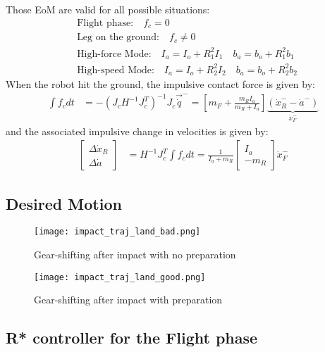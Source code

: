 %
Those EoM are valid for all possible situations:
%
\begin{align}
&\text{Flight phase:} \quad f_c = 0 \\
&\text{Leg on the ground:} \quad f_c \neq 0 \\
&\text{High-force Mode:} \quad I_a = I_o + R_1^2 I_1 \quad b_a = b_o + R_1^2 b_1 \\
&\text{High-speed Mode:} \quad I_a = I_o + R_2^2 I_2 \quad b_a = b_o + R_2^2 b_2
\end{align}
%
When the robot hit the ground, the impulsive contact force is given by:
%
\begin{align}
\int{  f_c dt } &= - \left( J_c H^{-1} J_c^T \right)^{-1}  J_c \vec{\dot{q}}^- =
\left[ m_F + \frac{m_R I_a}{m_R + I_a} \right] \underbrace{(\dot{x}_R^- - \dot{a}^-)}_{\dot{x}_F^-}
\label{eq:dsdm_impact_force}
\end{align}
%
and the associated impulsive change in velocities is given by:
%
\begin{align}
\left[ \begin{array}{c}
\Delta \dot{x}_R \\ \Delta \dot{a}
\end{array} \right]
 &= H^{-1} J_c^T \int{  f_c dt } = \frac{1}{I_a + m_R} \left[ \begin{array}{c}
I_a \\ -m_R
\end{array} \right] \dot{x}_F^-
\label{eq:dsdm_impact_delta}
\end{align}
%

\newpage

\subsection{Desired Motion}


\begin{figure}[H]
	\centering
		\texttt{[image: impact\_traj\_land\_bad.png]}
	\caption{Gear-shifting after impact with no preparation}
	\label{fig:fixed_bad_impact}
\end{figure}


\begin{figure}[H]
	\centering
		\texttt{[image: impact\_traj\_land\_good.png]}
	\caption{Gear-shifting after impact with preparation}
	\label{fig:fixed_bad_impact}
\end{figure}



\subsection{R* controller for the Flight phase}

